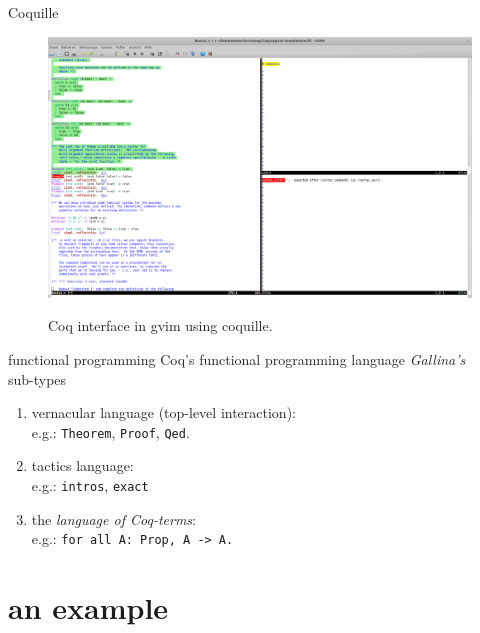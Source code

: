 \documentclass{beamer}
\begin{document}
	\begin{frame}{Coquille}
	\begin{figure}[h]
			\includegraphics[width=.9\textwidth]{coquille.png}
			\label{fig:screenshot-coquille}
			\caption{Coq interface in gvim using coquille.}
			\end{figure}
	\end{frame}
	
	
	\begin{frame}{functional programming}
		Coq's functional programming language {\itshape Gallina's}\\
		sub-types
			\begin{enumerate}
				\item vernacular language (top-level interaction):\\
					  e.g.: \lstinline!Theorem!, \lstinline!Proof!, \lstinline!Qed!.
				\item tactics language:\\
				e.g.: \lstinline!intros!, \lstinline!exact!\\
				 	
			\item the {\itshape language of Coq-terms}:\\
				e.g.:  \lstinline!for all A: Prop, A -> A.! 
			\end{enumerate}
	\end{frame}
	
	
	
	
	\section{an example}
	
	
	
\end{document}
